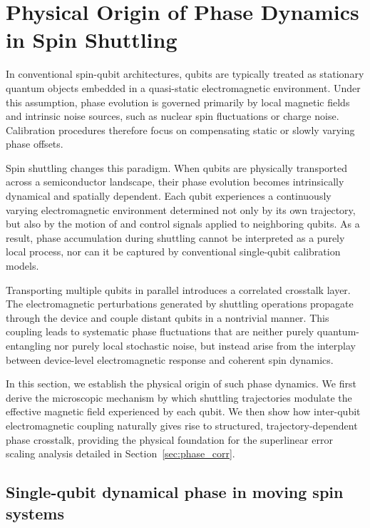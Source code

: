 \documentclass[a4paper,twocolumn,11pt]{quantumarticle}
\begin{document}
\section{Physical Origin of Phase Dynamics in Spin Shuttling}
\label{sec:physical_origin}

In conventional spin-qubit architectures, qubits are typically treated as stationary quantum objects embedded in a quasi-static electromagnetic environment. Under this assumption, phase evolution is governed primarily by local magnetic fields and intrinsic noise sources, such as nuclear spin fluctuations or charge noise. Calibration procedures therefore focus on compensating static or slowly varying phase offsets.

Spin shuttling changes this paradigm. When qubits are physically transported across a semiconductor landscape, their phase evolution becomes intrinsically dynamical and spatially dependent. Each qubit experiences a continuously varying electromagnetic environment determined not only by its own trajectory, but also by the motion of and control signals applied to neighboring qubits. As a result, phase accumulation during shuttling cannot be interpreted as a purely local process, nor can it be captured by conventional single-qubit calibration models.

Transporting multiple qubits in parallel introduces a correlated crosstalk layer. The electromagnetic perturbations generated by shuttling operations propagate through the device and couple distant qubits in a nontrivial manner. This coupling leads to systematic phase fluctuations that are neither purely quantum-entangling nor purely local stochastic noise, but instead arise from the interplay between device-level electromagnetic response and coherent spin dynamics.

In this section, we establish the physical origin of such phase dynamics. We first derive the microscopic mechanism by which shuttling trajectories modulate the effective magnetic field experienced by each qubit. We then show how inter-qubit electromagnetic coupling naturally gives rise to structured, trajectory-dependent phase crosstalk, providing the physical foundation for the superlinear error scaling analysis detailed in Section~\ref{sec:phase_corr}.

\subsection{Single-qubit dynamical phase in moving spin systems}
\end{document}
